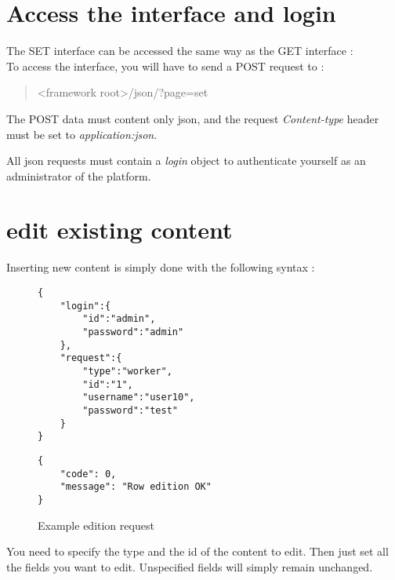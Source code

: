 \documentclass[notitlepage]{report}
\begin{document}
\section{Access the interface and login}
The SET interface can be accessed the same way as the GET interface :\\
To access the interface, you will have to send a POST request to : 
\begin{quote}<framework root>/json/?page=set\end{quote}
The POST data must content only json, and the request \emph{Content-type} header must be set to \emph{application:json}.

All json requests must contain a \emph{login} object to authenticate yourself as an administrator of the platform.

\section{edit existing content}
Inserting new content is simply done with the following syntax :
\begin{figure}[h]
\centering
\begin{minipage}{.45\linewidth}
\begin{verbatim}
{
    "login":{   
        "id":"admin",
        "password":"admin"
    },
    "request":{
        "type":"worker",
        "id":"1",
        "username":"user10",
        "password":"test"
    }
}
\end{verbatim}
\end{minipage}
\begin{minipage}{.45\linewidth}
\begin{verbatim}
{
    "code": 0,
    "message": "Row edition OK"
}
\end{verbatim}
\end{minipage}
\caption{Example edition request}
\end{figure}
You need to specify the type and the id of the content to edit. Then just set all the fields you want to edit. Unspecified fields will simply remain unchanged.

\newpage
\end{document}
